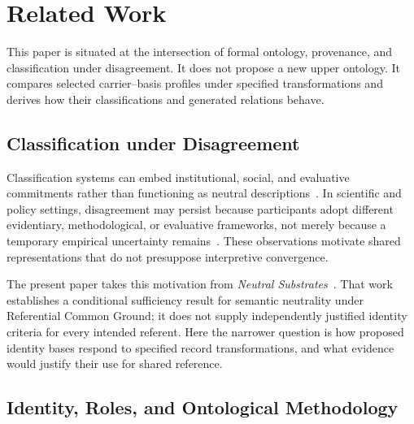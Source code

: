 
\section{Related Work}
\label{sec:related}

This paper is situated at the intersection of formal ontology, provenance,
and classification under disagreement.
It does not propose a new upper ontology.
It compares selected carrier--basis profiles under specified
transformations and derives how their classifications and generated
relations behave.

\subsection{Classification under Disagreement}
\label{subsec:related_classification_disagreement}

Classification systems can embed institutional, social, and evaluative
commitments rather than functioning as neutral descriptions~\citep{bowkerstar1999,haslanger2012}.
In scientific and policy settings, disagreement may persist because
participants adopt different evidentiary, methodological, or evaluative
frameworks, not merely because a temporary empirical uncertainty remains~\citep{longino1990}.
These observations motivate shared representations that do not presuppose
interpretive convergence.

The present paper takes this motivation from \emph{Neutral Substrates}~\citep{case2026neutral}.
That work establishes a conditional sufficiency result for semantic
neutrality under Referential Common Ground; it does not supply
independently justified identity criteria for every intended referent.
Here the narrower question is how proposed identity bases respond to
specified record transformations, and what evidence would justify their
use for shared reference.


\subsection{Identity, Roles, and Ontological Methodology}
\label{subsec:related_identity_roles}

